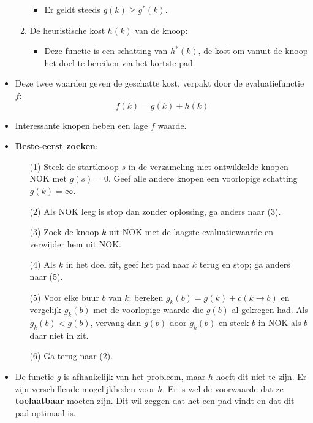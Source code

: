 \begin{itemize}
\begin{enumerate}
\begin{itemize}
			\item Er geldt steeds $g(k) \geq g^*(k)$.
		\end{itemize} 
		\item De heuristische kost $h(k)$ van de knoop:
		\begin{itemize}
			\item Deze functie is een schatting van $h^*(k)$, de kost om vanuit de knoop het doel te bereiken via het kortste pad.
		\end{itemize}
	\end{enumerate}
	\item Deze twee waarden geven de geschatte kost, verpakt door de evaluatiefunctie $f$:
	$$f(k) = g(k) + h(k)$$
	\item Interessante knopen heben een lage $f$ waarde. 
	\item \textbf{Beste-eerst zoeken}:
	\begin{enumerate}
		\item[(1)] Steek de startknoop $s$ in de verzameling niet-ontwikkelde knopen NOK met $g(s) = 0$. Geef alle andere knopen een voorlopige schatting $g(k) = \infty$.
		\item[(2)] Als NOK leeg is stop dan zonder oplossing, ga anders naar (3).
		\item[(3)] Zoek de knoop $k$ uit NOK met de laagste evaluatiewaarde en verwijder hem uit NOK.
		\item[(4)] Als $k$ in het doel zit, geef het pad naar $k$ terug en stop; ga anders naar (5).
		\item[(5)] Voor elke buur $b$ van $k$: bereken $g_k(b) = g(k) + c(k \rightarrow b)$ en vergelijk $g_k(b)$ met de voorlopige waarde die $g(b)$ al gekregen had. Als $g_k(b) < g(b)$, vervang dan $g(b)$ door $g_k(b)$ en steek $b$ in NOK als $b$ daar niet in zit.
		\item[(6)] Ga terug naar (2).
	\end{enumerate}
	\item De functie $g$ is afhankelijk van het probleem, maar $h$ hoeft dit niet te zijn. Er zijn verschillende mogelijkheden voor $h$. Er is wel de voorwaarde dat ze \textbf{toelaatbaar} moeten zijn. Dit wil zeggen dat het een pad vindt en dat dit pad optimaal is.
\end{itemize}

